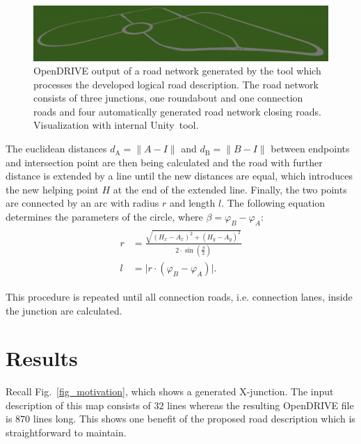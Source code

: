 \documentclass[a4paper, 10pt, conference]{ieeeconf}      %
\begin{document}
\begin{figure}
	\includegraphics[width=\textwidth]{fig/res_huge.PNG}
	\caption[dummy2]{OpenDRIVE output of a road network generated by the tool which processes the developed logical road description. The road network consists of three junctions, one roundabout and one connection roads and four automatically generated road network closing roads. Visualization with internal Unity\footnotemark~tool.}
	\label{fig_resHuge}
\end{figure} %

    The euclidean distances $d_\text{A} = \|A-I\|$ and $d_\text{B} = \|B-I\|$ between endpoints and intersection point are then being calculated and the road with further distance is extended by a line until the new distances are equal, which introduces the new helping point \(H\) at the end of the extended line. Finally, the two points are connected by an arc with radius \(r\) and length \(l\). The following equation determines the parameters of the circle, where \(\beta = \varphi_B - \varphi_A\):
    \begin{align}
        \begin{split}           
        r &= \frac{\sqrt{\left(H_x - A_x\right)^2 + \left(H_y - A_y\right)^2}}{2 \cdot \sin\left(\frac{\beta}{2}\right)} \\
        l &= \vert r \cdot \left(\varphi_B - \varphi_A\right) \vert \text{.}  
        \end{split}
    \end{align}
    
    This procedure is repeated until all connection roads, i.e. connection lanes, inside the junction are calculated.
   
\section{Results}
Recall Fig.~\ref{fig_motivation}, which shows a generated X-junction. The input description of this map consists of $32$ lines whereas the resulting OpenDRIVE file is $870$ lines long. This shows one benefit of the proposed road description which is straightforward to maintain.
\end{document}
